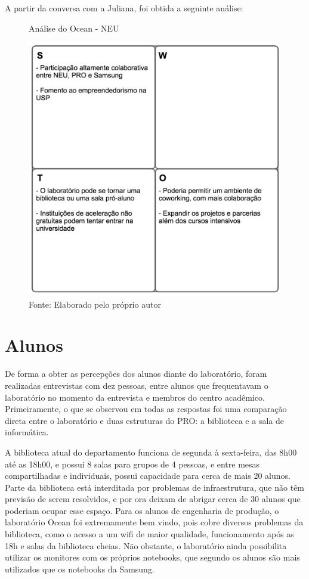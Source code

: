 A partir da conversa com a Juliana, foi obtida a seguinte análise:

\begin{figure}[H]
\caption{Análise do Ocean - NEU}
\centerline{\includegraphics[scale=0.75]{img/neuswot}}
\label{fig:swotneu}
\caption* {Fonte: Elaborado pelo próprio autor}
\end{figure}

\section{Alunos}

De forma a obter as percepções dos alunos diante do laboratório, foram realizadas entrevistas com dez pessoas, entre alunos que frequentavam o laboratório no momento da entrevista e membros do centro acadêmico. Primeiramente, o que se observou em todas as respostas foi uma comparação direta entre o laboratório e duas estruturas do PRO: a biblioteca e a sala de informática. 

A biblioteca atual do departamento funciona de segunda à sexta-feira, das 8h00 até as 18h00, e possui 8 salas para grupos de 4 pessoas, e entre mesas compartilhadas e individuais, possui capacidade para cerca de mais 20 alunos. Parte da biblioteca está interditada por problemas de infraestrutura, que não têm previsão de serem resolvidos, e por ora deixam de abrigar cerca de 30 alunos que poderiam ocupar esse espaço. Para os alunos de engenharia de produção, o laboratório Ocean foi extremamente bem vindo, pois cobre diversos problemas da biblioteca, como o acesso a um wifi de maior qualidade, funcionamento após as 18h e salas da biblioteca cheias. Não obstante, o laboratório ainda possibilita utilizar os monitores com os próprios notebooks, que segundo os alunos são mais utilizados que os notebooks da Samsung.

